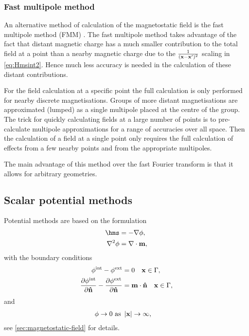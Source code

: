 \subsubsection{Fast multipole method}
\label{sec:fast-mult-meth}

An alternative method of calculation of the magnetostatic field is the fast multipole method (FMM) \cite{Beatson1997}.
The fast multipole method takes advantage of the fact that distant magnetic charge has a much smaller contribution to the total field at a point than a nearby magnetic charge due to the $\frac{1}{(\boldsymbol{\mathrm{x}} - \boldsymbol{\mathrm{x}}')^2}$ scaling in \cref{eq:Hmsint2}.
Hence much less accuracy is needed in the calculation of these distant contributions.

For the field calculation at a specific point the full calculation is only performed for nearby discrete magnetisations.
Groups of more distant magnetisations are approximated (lumped) as a single multipole placed at the centre of the group.
The trick for quickly calculating fields at a large number of points is to pre-calculate multipole approximations for a range of accuracies over all space.
Then the calculation of a field at a single point only requires the full calculation of effects from a few nearby points and from the appropriate multipoles.

The main advantage of this method over the fast Fourier transform is that it allows for arbitrary geometries.


\subsection{Scalar potential methods}
\label{sec:magstat-field-calc-pote}

Potential methods are based on the formulation
\begin{equation}
  \begin{aligned}
    \label{eq:Hms2}
    \hms &= - \grad \phim, \\
    \lap \phim &= \div \mv,
  \end{aligned}
\end{equation}
with the boundary conditions
\begin{equation}
  \begin{aligned}
    \label{eq:cont-phi-bound2}
    \phi^{\mathrm{int}} - \phi^{\mathrm{ext}} &= 0 \quad \boldsymbol{\mathrm{x}} \in {\Gamma}, \\
    \frac{\partial \phi^{\mathrm{int}}}{\partial \boldsymbol{\mathrm{\hat{n}}}} - \frac{\partial \phi^{\mathrm{ext}}}{\partial \boldsymbol{\mathrm{\hat{n}}}} &= \boldsymbol{\mathrm{m}} \cdot \boldsymbol{\mathrm{\hat{n}}} \quad \boldsymbol{\mathrm{x}} \in {\Gamma}, \\
  \end{aligned}
\end{equation}
and
\begin{equation}
  \begin{aligned}
    \label{eq:phi-inf-bound}
    \phi \rightarrow 0 \text{ as } &\left|{\boldsymbol{\mathrm{x}}} \right| \rightarrow \infty,
  \end{aligned}
\end{equation}
see \cref{sec:magnetostatic-field} for details.

